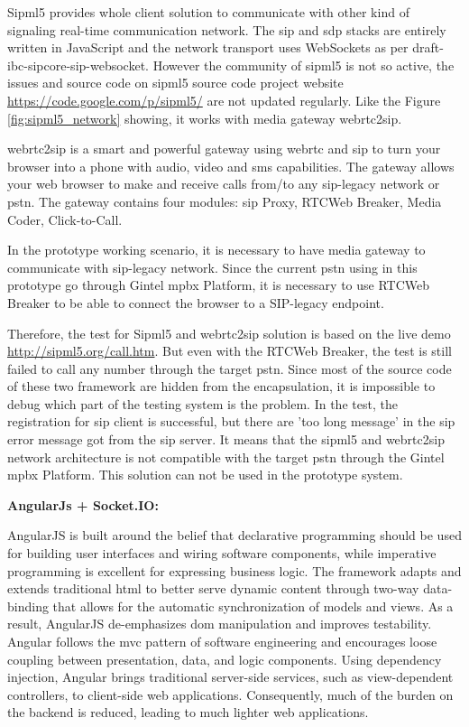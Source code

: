 \par Sipml5 provides whole client solution to communicate with other kind of signaling real-time communication network. The \gls{sip} and \gls{sdp} stacks are entirely written in JavaScript and the network transport uses WebSockets as per draft-ibc-sipcore-sip-websocket. However the community of sipml5 is not so active, the issues and source code on sipml5 source code project website \url{https://code.google.com/p/sipml5/} are not updated regularly. Like the Figure \ref{fig:sipml5_network} showing, it works with media gateway webrtc2sip.

\par webrtc2sip is a smart and powerful gateway using \gls{webrtc} and \gls{sip} to turn your browser into a phone with audio, video and \gls{sms} capabilities. The gateway allows your web browser to make and receive calls from/to any \gls{sip}-legacy network or \gls{pstn}.
The gateway contains four modules: \gls{sip} Proxy, RTCWeb Breaker, Media Coder, Click-to-Call.\cite{website:webrtc2sip}

\par In the prototype working scenario, it is necessary to have media gateway to communicate with \gls{sip}-legacy network. Since the current \gls{pstn} using in this prototype go through Gintel \gls{mpbx} Platform, it is necessary to use RTCWeb Breaker to be able to connect the browser to a SIP-legacy endpoint.

\par Therefore, the test for Sipml5 and webrtc2sip solution is based on the live demo \url{http://sipml5.org/call.htm}. But even with the RTCWeb Breaker, the test is still failed to call any number through the target \gls{pstn}. Since most of the source code of these two framework are hidden from the encapsulation, it is impossible to debug which part of the testing system is the problem. In the test, the registration for \gls{sip} client is successful, but there are 'too long message' in the \gls{sip} error message got from the \gls{sip} server. It means that the sipml5 and webrtc2sip network architecture is not compatible with the target \gls{pstn} through the Gintel \gls{mpbx} Platform. This solution can not be used in the prototype system.

\textbf{AngularJs + Socket.IO:}

\par AngularJS is built around the belief that declarative programming should be used for building user interfaces and wiring software components, while imperative programming is excellent for expressing business logic. The framework adapts and extends traditional \gls{html} to better serve dynamic content through two-way data-binding that allows for the automatic synchronization of models and views. As a result, AngularJS de-emphasizes \gls{dom} manipulation and improves testability. Angular follows the \gls{mvc} pattern of software engineering and encourages loose coupling between presentation, data, and logic components. Using dependency injection, Angular brings traditional server-side services, such as view-dependent controllers, to client-side web applications. Consequently, much of the burden on the backend is reduced, leading to much lighter web applications.\cite{wiki:angularjs}

